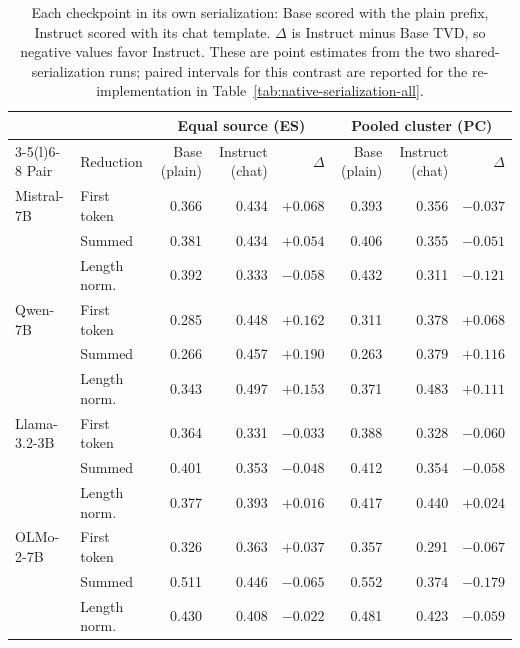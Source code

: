 \begin{table}[t]
\centering\small
\setlength{\tabcolsep}{4pt}
\begin{tabular}{@{}llrrrrrr@{}}
\toprule
& & \multicolumn{3}{c}{Equal source (ES)} & \multicolumn{3}{c}{Pooled cluster (PC)} \\
\cmidrule(lr){3-5}\cmidrule(l){6-8}
Pair & Reduction & Base (plain) & Instruct (chat) & $\Delta$ & Base (plain) & Instruct (chat) & $\Delta$ \\
\midrule
Mistral-7B & First token & 0.366 & 0.434 & $+0.068$ & 0.393 & 0.356 & $-0.037$ \\
 & Summed & 0.381 & 0.434 & $+0.054$ & 0.406 & 0.355 & $-0.051$ \\
 & Length norm. & 0.392 & 0.333 & $-0.058$ & 0.432 & 0.311 & $-0.121$ \\
\addlinespace[2pt]
Qwen-7B & First token & 0.285 & 0.448 & $+0.162$ & 0.311 & 0.378 & $+0.068$ \\
 & Summed & 0.266 & 0.457 & $+0.190$ & 0.263 & 0.379 & $+0.116$ \\
 & Length norm. & 0.343 & 0.497 & $+0.153$ & 0.371 & 0.483 & $+0.111$ \\
\addlinespace[2pt]
Llama-3.2-3B & First token & 0.364 & 0.331 & $-0.033$ & 0.388 & 0.328 & $-0.060$ \\
 & Summed & 0.401 & 0.353 & $-0.048$ & 0.412 & 0.354 & $-0.058$ \\
 & Length norm. & 0.377 & 0.393 & $+0.016$ & 0.417 & 0.440 & $+0.024$ \\
\addlinespace[2pt]
OLMo-2-7B & First token & 0.326 & 0.363 & $+0.037$ & 0.357 & 0.291 & $-0.067$ \\
 & Summed & 0.511 & 0.446 & $-0.065$ & 0.552 & 0.374 & $-0.179$ \\
 & Length norm. & 0.430 & 0.408 & $-0.022$ & 0.481 & 0.423 & $-0.059$ \\
\bottomrule
\end{tabular}
\caption{Each checkpoint in its own serialization: Base scored with the plain prefix, Instruct scored with its chat template. $\Delta$ is Instruct minus Base TVD, so negative values favor Instruct. These are point estimates from the two shared-serialization runs; paired intervals for this contrast are reported for the re-implementation in Table~\ref{tab:native-serialization-all}.}
\label{tab:native-serialization}
\end{table}
